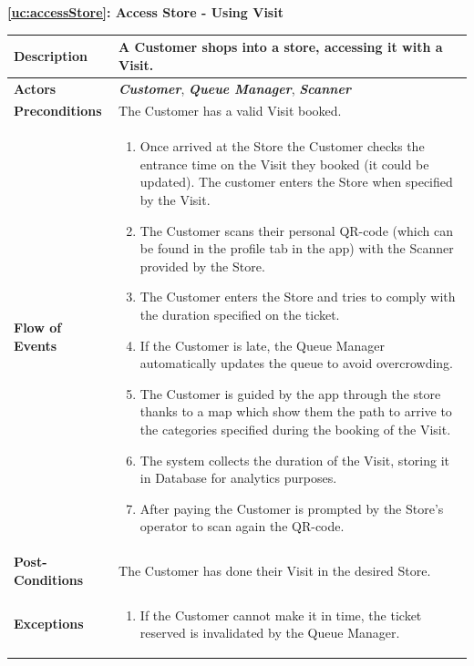 \documentclass[a4paper, 12pt, oneside]{article}
\begin{document}
\begin{center}
{\textbf{\ref{uc:accessStore}: Access Store - Using Visit}}
\end{center}
\begin{tabularx}{\linewidth}{| l | X |}
	
	\hline
	\textbf{Description} & A Customer shops into a store, accessing it with a Visit.\\
	

	\hline
	\textbf{Actors} & \textbf{\textit{Customer}}, \textit{\textbf{Queue Manager}}, \textit{\textbf{Scanner}}  \\
	
	\hline
	\textbf{Preconditions} & The Customer has a valid Visit booked.\\
	
	\hline
	\textbf{Flow of Events} & \parbox{0.7\textwidth}{	
		\begin{enumerate}
			\item Once arrived at the Store the Customer checks the entrance time on the Visit they booked (it could be updated). The customer enters the Store when specified by the Visit.
			\item The Customer scans their personal QR-code (which can be found in the profile tab in the app) with the Scanner provided by the Store.
			\item The Customer enters the Store and tries to comply with the duration specified on the ticket.
			\item If the Customer is late, the Queue Manager automatically updates the queue to avoid overcrowding.
			\item The Customer is guided by the app through the store thanks to a map which show them the path to arrive to the categories specified during the booking of the Visit.
			\item The system collects the duration of the Visit, storing it in Database for analytics purposes.
			\item After paying the Customer is prompted by the Store's operator to scan again the QR-code.
	\end{enumerate}}\\
	
	\hline
	\textbf{Post-Conditions} & The Customer has done their Visit in the desired Store.\\
	
	\hline
	\textbf{Exceptions} & \parbox{0.7\textwidth}{ \begin{enumerate}
			\item If the Customer cannot make it in time, the ticket reserved is invalidated by the Queue Manager.
		\end{enumerate}}\\

	\hline
\end{tabularx}
\end{document}
